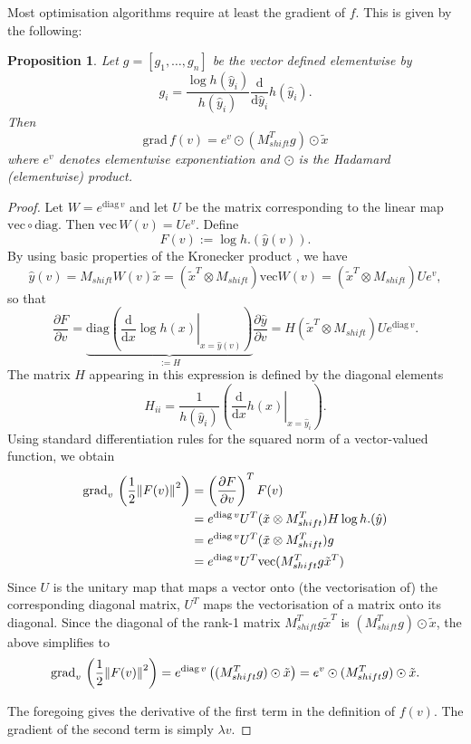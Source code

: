 \documentclass{article}
\newtheorem{proposition}{Proposition}
\begin{document}
Most optimisation algorithms require at least the gradient of $f$. This is given by the following:
\begin{proposition}
    Let $g = [g_1, \dots, g_n]$ be the vector defined elementwise by 
    $$
    g_i = \frac{\log h(\hat{y}_i)}{h(\hat{y}_i)} \frac{\mathrm{d}}{\mathrm{d}\hat{y}_i} h(\hat{y}_i)
    .$$
    Then 
    $$
    \mathrm{grad}\, f(v) = e^v \odot (M_{shift}^T g) \odot \tilde{x} 
    $$
    where $e^v$ denotes elementwise exponentiation and $\odot$ is the Hadamard (elementwise) product.
\end{proposition}
\begin{proof}
Let $W = e^{\mathrm{diag}\, v}$ and let $U$ be the matrix corresponding to the linear map $\mathrm{vec} \circ \mathrm{diag}$. Then $\mathrm{vec}\, W(v) = U e^v$.
Define $$
F(v) := \log h.(\hat{y}(v))
.$$
By using basic properties of the Kronecker product \cite[eq. 1.3.6]{Golub2013}, we have
$$
\hat{y}(v) = M_{shift} W(v) \tilde{x}
=
(\tilde{x}^T \otimes M_{shift}) \mathrm{vec} W(v)
=
(\tilde{x}^T \otimes M_{shift}) U e^v
,$$
so that
$$
\frac{\partial F}{\partial v}
=
\underbrace{\mathrm{diag}\left(
    \left.\frac{\mathrm{d}}{\mathrm{d}x} \log h(x)\right\vert_{x = \hat{y}(v)}
    \right)}_{:= H}
\frac{\partial \hat{y}}{\partial v}
=
H (\tilde{x}^T \otimes M_{shift}) U e^{\mathrm{diag}\, v}
.$$
The matrix $H$ appearing in this expression is defined by the diagonal elements 
$$
H_{ii} = \frac{1}{h(\hat{y}_i)}\left(\left.\frac{\mathrm{d}}{\mathrm{d}x} h(x)\right\vert_{x = \hat{y}_i} \right)
.$$
Using standard differentiation rules for the squared norm of a vector-valued function, we obtain
\begin{align*}
\mathrm{grad}_v\, \left(\frac{1}{2} \norm{F(v)}^2 \right)
&=
\left(\frac{\partial F}{\partial v}\right)^T F(v) \\
&= e^{\mathrm{diag}\, v} U^T (\tilde{x} \otimes M_{shift}^T) H \log h.(\hat{y}) \\
&= e^{\mathrm{diag}\, v} U^T (\tilde{x} \otimes M_{shift}^T) g \\
&= e^{\mathrm{diag}\, v} U^T \mathrm{vec}(M_{shift}^T g \tilde{x}^T)
\end{align*}
Since $U$ is the unitary map that maps a vector onto (the vectorisation of) the corresponding diagonal matrix, $U^T$ maps the vectorisation of a matrix onto its diagonal.
Since the diagonal of the rank-1 matrix $M_{shift}^T g \tilde{x}^T$ is $(M_{shift}^T g) \odot \tilde{x}$, the above simplifies to
$$
\mathrm{grad}_v\, \left(\frac{1}{2} \norm{F(v)}^2 \right)
=
e^{\mathrm{diag}\, v} \left( (M_{shift}^T g) \odot \tilde{x} \right) = e^{v} \odot (M_{shift}^T g) \odot \tilde{x}
.$$


The foregoing gives the derivative of the first term in the definition of $f(v)$. The gradient of the second term is simply $\lambda v$.
\end{proof}
\end{document}
